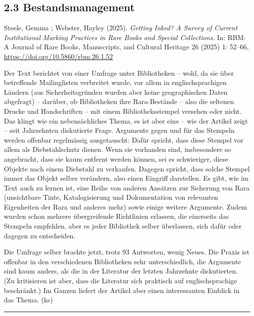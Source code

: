 \documentclass[a4paper,
fontsize=11pt,
oneside,
numbers=noperiodatend,
parskip=half-,
bibliography=totoc,
final
]{scrartcl}
\begin{document}
\subsection{2.3 Bestandsmanagement}\label{bestandsmanagement}

Steele, Gemma ; Webster, Hayley (2025). \emph{Getting Inked? A Survey of
Current Institutional Marking Practices in Rare Books and Special
Collections}. In: RBM: A Journal of Rare Books, Manuscripts, and
Cultural Heritage 26 (2025) 1: 52--66,
\url{https://doi.org/10.5860/rbm.26.1.52}

Der Text berichtet von einer Umfrage unter Bibliotheken -- wohl, da sie
über betreffende Mailinglisten verbreitet wurde, vor allem in
englischsprachigen Ländern (aus Sicherheitsgründen wurden aber keine
geographischen Daten abgefragt) -- darüber, ob Bibliotheken ihre
Rara-Bestände -- also die seltenen Drucke und Handschriften -- mit einem
Bibliotheksstempel versehen oder nicht. Das klingt wie ein
nebensächliches Thema, es ist aber eine -- wie der Artikel zeigt -- seit
Jahrzehnten diskutierte Frage. Argumente gegen und für das Stempeln
werden offenbar regelmässig ausgetauscht: Dafür spricht, dass diese
Stempel vor allem als Diebstahlschutz dienen. Wenn sie vorhanden sind,
insbesondere so angebracht, dass sie kaum entfernt werden können, sei es
schwieriger, diese Objekte nach einem Diebstahl zu verkaufen. Dagegen
spricht, dass solche Stempel immer das Objekt selber verändern, also
einen Eingriff darstellen. Es gibt, wie im Text auch zu lernen ist, eine
Reihe von anderen Ansätzen zur Sicherung von Rara (unsichtbare Tinte,
Katalogisierung und Dokumentation von relevanten Eigenheiten der Rara
und anderes mehr) sowie einige weitere Argumente. Zudem wurden schon
mehrere übergreifende Richtlinien erlassen, die einerseits das Stempeln
empfehlen, aber es jeder Bibliothek selber überlassen, sich dafür oder
dagegen zu entscheiden.

Die Umfrage selber brachte jetzt, trotz 93 Antworten, wenig Neues. Die
Praxis ist offenbar in den verschiedenen Bibliotheken sehr
unterschiedlich, die Argumente sind kaum anders, als die in der
Literatur der letzten Jahrzehnte diskutierten. (Zu kritisieren ist aber,
dass die Literatur sich praktisch auf englischsprachige beschränkt.) Im
Ganzen liefert der Artikel aber einen interessanten Einblick in das
Thema. (ks)

\begin{center}\rule{0.5\linewidth}{0.5pt}\end{center}
\end{document}
